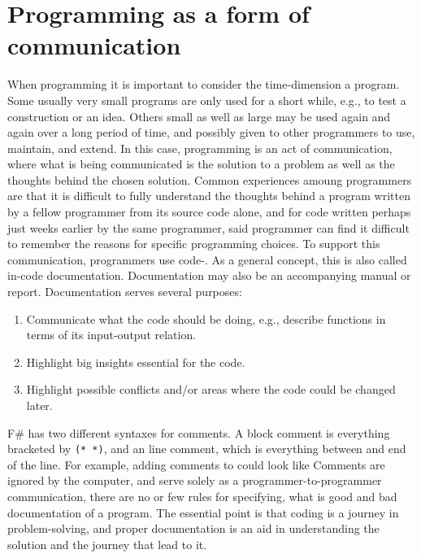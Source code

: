 \documentclass[springer.tex]{subfiles}
\begin{document}
\section{Programming as a form of communication}
When programming it is important to consider the time-dimension a program. Some usually very small programs are only used for a short while, e.g., to test a construction or an idea. Others small as well as large may be used again and again over a long period of time, and possibly given to other programmers to use, maintain, and extend. In this case, programming is an act of communication, where what is being communicated is the solution to a problem as well as the thoughts behind the chosen solution. Common experiences amoung programmers are that it is difficult to fully understand the thoughts behind a program written by a fellow programmer from its source code alone, and for code written perhaps just weeks earlier by the same programmer, said programmer can find it difficult to remember the reasons for specific programming choices. To support this communication, programmers use code-. As a general concept, this is also called in-code documentation. Documentation may also be an accompanying manual or report. Documentation serves several purposes:
\begin{enumerate}
\item Communicate what the code should be doing, e.g., describe functions in terms of its input-output relation.
\item Highlight big insights essential for the code.
\item Highlight possible conflicts and/or areas where the code could be changed later.
\end{enumerate}
F\# has two different syntaxes for comments. A block comment is everything bracketed by \lstinline{(* *)}, and an line comment, which is everything between \lexeme{//} and end of the line. For example, adding comments to  could look like 
% 
%
Comments are ignored by the computer, and serve solely as a programmer-to-programmer communication, there are no or few rules for specifying, what is good and bad documentation of a program. The essential point is that coding is a journey in problem-solving, and proper documentation is an aid in understanding the solution and the journey that lead to it.
\end{document}
